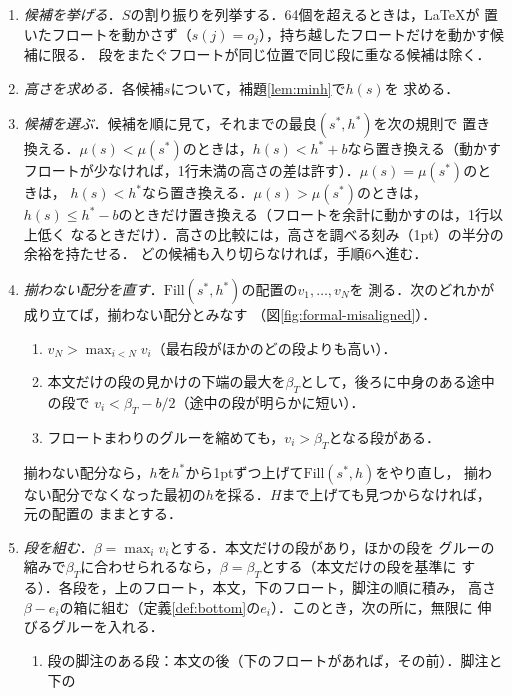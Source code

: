 \documentclass[paper=a4,fontsize=10pt]{jlreq}
\newcommand\kyocho[1]{{\gtfamily\itshape #1}}
\newenvironment{tejun}{%
  \par\noindent{\gtfamily\sffamily 手順}\hspace{1\zw}\ignorespaces}
  {\par\addvspace{.5\baselineskip}}
\begin{document}
\begin{tejun}
\begin{enumerate}
  \item \kyocho{候補を挙げる}．$S$の割り振りを列挙する．64個を超えるときは，\LaTeX{}が
    置いたフロートを動かさず（$s(j)=o_j$），持ち越したフロートだけを動かす候補に限る．
    段をまたぐフロートが同じ位置で同じ段に重なる候補は除く．{\par}
  \item \kyocho{高さを求める}．各候補$s$について，補題\ref{lem:minh}で$h(s)$を
    求める．
  \item \kyocho{候補を選ぶ}．候補を順に見て，それまでの最良$(s^*,h^*)$を次の規則で
    置き換える．$\mu(s)<\mu(s^*)$のときは，$h(s)<h^*+b$なら置き換える（動かす
    フロートが少なければ，1行未満の高さの差は許す）．$\mu(s)=\mu(s^*)$のときは，
    $h(s)<h^*$なら置き換える．$\mu(s)>\mu(s^*)$のときは，
    $h(s)\le h^*-b$のときだけ置き換える（フロートを余計に動かすのは，1行以上低く
    なるときだけ）．高さの比較には，高さを調べる刻み（1pt）の半分の余裕を持たせる．
    どの候補も入り切らなければ，手順6へ進む．
  \item \kyocho{揃わない配分を直す}．$\mathrm{Fill}(s^*,h^*)$の配置の$v_1,\dots,v_N$を
    測る．次のどれかが成り立てば，揃わない配分とみなす
    （図\ref{fig:formal-misaligned}）．
    \begin{enumerate}
      \item $v_N>\max_{i<N}v_i$（最右段がほかのどの段よりも高い）．
      \item 本文だけの段の見かけの下端の最大を$\beta_T$として，後ろに中身のある途中の段で
        $v_i<\beta_T-b/2$（途中の段が明らかに短い）．
      \item フロートまわりのグルーを縮めても，$v_i>\beta_T$となる段がある．
    \end{enumerate}
    揃わない配分なら，$h$を$h^*$から1ptずつ上げて$\mathrm{Fill}(s^*,h)$をやり直し，
    揃わない配分でなくなった最初の$h$を採る．$H$まで上げても見つからなければ，元の配置の
    ままとする．
  \item \kyocho{段を組む}．$\beta=\max_i v_i$とする．本文だけの段があり，ほかの段を
    グルーの縮みで$\beta_T$に合わせられるなら，$\beta=\beta_T$とする（本文だけの段を基準に
    する）．各段を，上のフロート，本文，下のフロート，脚注の順に積み，
    高さ$\beta-e_i$の箱に組む（定義\ref{def:bottom}の$e_i$）．このとき，次の所に，無限に
    伸びるグルーを入れる．
    \begin{enumerate}
      \item 段の脚注のある段：本文の後（下のフロートがあれば，その前）．脚注と下の

\end{enumerate}
\end{enumerate}
\end{tejun}
\end{document}

